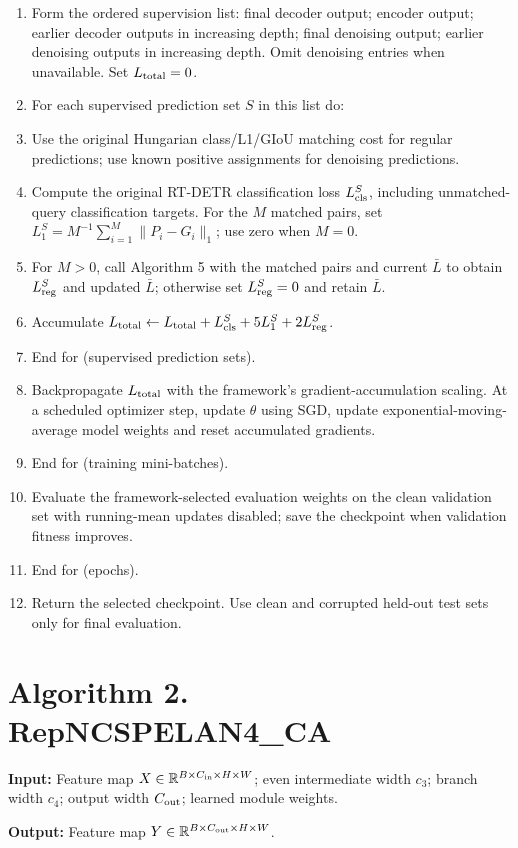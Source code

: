 \documentclass[10pt]{article}
\begin{document}
\begin{enumerate}[label=\arabic*:,leftmargin=2em,itemsep=3pt]
\item Form the ordered supervision list: final decoder output; encoder output; earlier decoder outputs in increasing depth; final denoising output; earlier denoising outputs in increasing depth. Omit denoising entries when unavailable. Set $L_{\rm total}=0$.
\item For each supervised prediction set $S$ in this list do:
\item Use the original Hungarian class/L1/GIoU matching cost for regular predictions; use known positive assignments for denoising predictions.
\item Compute the original RT-DETR classification loss $L_{\rm cls}^{S}$, including unmatched-query classification targets. For the $M$ matched pairs, set $L_1^{S}=M^{-1}\sum_{i=1}^{M}\|P_i-G_i\|_1$; use zero when $M=0$.
\item For $M>0$, call Algorithm 5 with the matched pairs and current $\bar L$ to obtain $L_{\rm reg}^{S}$ and updated $\bar L$; otherwise set $L_{\rm reg}^{S}=0$ and retain $\bar L$.
\item Accumulate $L_{\rm total}\gets L_{\rm total}+L_{\rm cls}^{S}+5L_1^{S}+2L_{\rm reg}^{S}$.
\item End for (supervised prediction sets).
\item Backpropagate $L_{\rm total}$ with the framework's gradient-accumulation scaling. At a scheduled optimizer step, update $\theta$ using SGD, update exponential-moving-average model weights and reset accumulated gradients.
\item End for (training mini-batches).
\item Evaluate the framework-selected evaluation weights on the clean validation set with running-mean updates disabled; save the checkpoint when validation fitness improves.
\item End for (epochs).
\item Return the selected checkpoint. Use clean and corrupted held-out test sets only for final evaluation.
\end{enumerate}
\section*{Algorithm 2. RepNCSPELAN4\_CA}
\textbf{Input:} Feature map $X\in\mathbb R^{B\times C_{\rm in}\times H\times W}$; even intermediate width $c_3$; branch width $c_4$; output width $C_{\rm out}$; learned module weights.

\textbf{Output:} Feature map $Y\in\mathbb R^{B\times C_{\rm out}\times H\times W}$.
\end{document}
